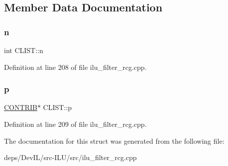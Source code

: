 \subsection{Member Data Documentation}
\mbox{\label{structCLIST_a45dc4be27394bc1e5b46fb8e1fee798c}} 
\subsubsection{\texorpdfstring{n}{n}}
{\footnotesize\ttfamily int C\+L\+I\+S\+T\+::n}



Definition at line 208 of file ilu\+\_\+filter\+\_\+rcg.\+cpp.

\mbox{\label{structCLIST_a2b8eedef16f5e74fdf5770dd86a66d40}} 
\subsubsection{\texorpdfstring{p}{p}}
{\footnotesize\ttfamily \hyperlink{structCONTRIB}{C\+O\+N\+T\+R\+IB}$\ast$ C\+L\+I\+S\+T\+::p}



Definition at line 209 of file ilu\+\_\+filter\+\_\+rcg.\+cpp.



The documentation for this struct was generated from the following file\+:\begin{DoxyCompactItemize}
\item 
deps/\+Dev\+I\+L/src-\/\+I\+L\+U/src/ilu\+\_\+filter\+\_\+rcg.\+cpp\end{DoxyCompactItemize}
